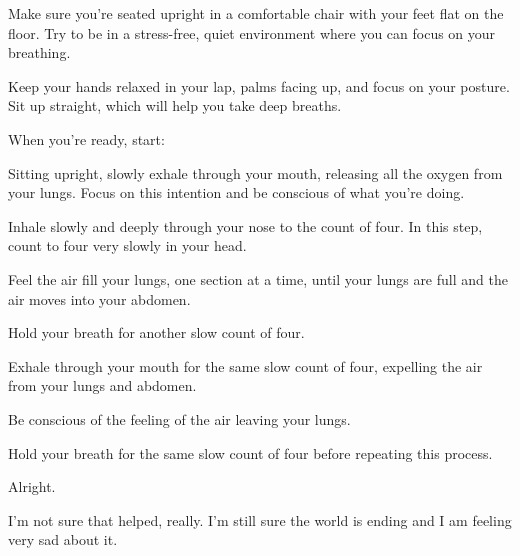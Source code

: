 \documentclass{screenplay}[2012/06/30]
\begin{document}
Make sure you're seated upright in a comfortable chair with your feet flat on the floor. Try to be in a stress-free, quiet environment where you can focus on your breathing.

Keep your hands relaxed in your lap, palms facing up, and focus on your posture. Sit up straight, which will help you take deep breaths.

When you're ready, start:

Sitting upright, slowly exhale through your mouth, releasing all the oxygen from your lungs. Focus on this intention and be conscious of what you're doing.

Inhale slowly and deeply through your nose to the count of four. In this step, count to four very slowly in your head.

Feel the air fill your lungs, one section at a time, until your lungs are full and the air moves into your abdomen.

Hold your breath for another slow count of four.

Exhale through your mouth for the same slow count of four, expelling the air from your lungs and abdomen.

Be conscious of the feeling of the air leaving your lungs.

Hold your breath for the same slow count of four before repeating this process.

Alright.

I'm not sure that helped, really. I'm still sure the world is ending and I am feeling very sad about it. 
\end{document}
